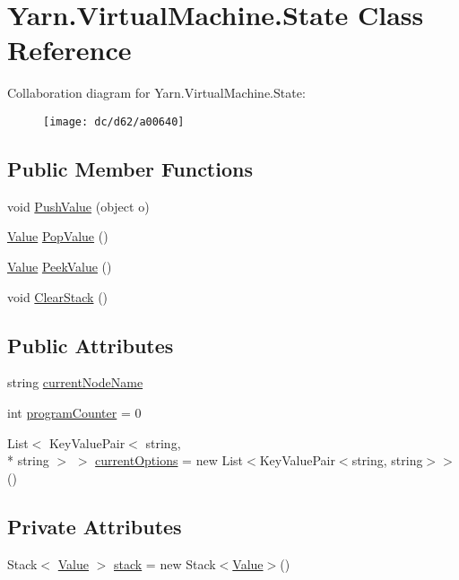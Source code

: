 \hypertarget{a00141}{\section{Yarn.\-Virtual\-Machine.\-State Class Reference}
\label{a00141}
}


Collaboration diagram for Yarn.\-Virtual\-Machine.\-State\-:
\nopagebreak
\begin{figure}[H]
\begin{center}
\leavevmode
\texttt{[image: dc/d62/a00640]}
\end{center}
\end{figure}
\subsection*{Public Member Functions}
\begin{DoxyCompactItemize}
\item 
void \hyperlink{a00141_aace44f5b85b9f746fede834becda4a8e}{Push\-Value} (object o)
\item 
\hyperlink{a00163}{Value} \hyperlink{a00141_a36881a888ea2839d74c3d4e7c199f4ee}{Pop\-Value} ()
\item 
\hyperlink{a00163}{Value} \hyperlink{a00141_a54fd5b64ec94e937e771846167242dc2}{Peek\-Value} ()
\item 
void \hyperlink{a00141_a9c787097fbbbbf1680e4960cda092535}{Clear\-Stack} ()
\end{DoxyCompactItemize}
\subsection*{Public Attributes}
\begin{DoxyCompactItemize}
\item 
string \hyperlink{a00141_a86f481fad527f719b49f8fee6ff79764}{current\-Node\-Name}
\item 
int \hyperlink{a00141_a2c76546b54b4fb573d7f14d79ce230a3}{program\-Counter} = 0
\item 
List$<$ Key\-Value\-Pair$<$ string, \\*
string $>$ $>$ \hyperlink{a00141_ab816dfea32ecda23282700f01454e0a9}{current\-Options} = new List$<$Key\-Value\-Pair$<$string, string$>$$>$()
\end{DoxyCompactItemize}
\subsection*{Private Attributes}
\begin{DoxyCompactItemize}
\item 
Stack$<$ \hyperlink{a00163}{Value} $>$ \hyperlink{a00141_a0bc84abf38b3ff31cbb47363b851c233}{stack} = new Stack$<$\hyperlink{a00163}{Value}$>$()
\end{DoxyCompactItemize}


